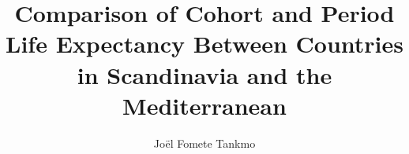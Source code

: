 \documentclass[a4paper,final]{memoir} %
\title{Comparison of Cohort and Period Life Expectancy Between Countries in Scandinavia and the Mediterranean}
\author {Joël Fomete Tankmo}
\begin{document}
    \masterfrontpage
    \frontmatter        %

    
    

    \cleartorecto
    \tableofcontents    %
    
    \mainmatter         %
    
    
    
    
    
    
     
   
    \backmatter         %
    
  
%    

    \printbibliography 
\end{document}

